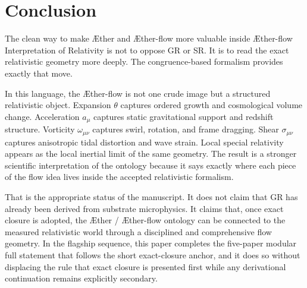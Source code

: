 \documentclass[11pt]{article}
\newcommand{\Aether}{\AE{}ther}
\newcommand{\Aflow}{\AE{}ther-flow}
\newcommand{\TheoryName}{\Aflow{} Interpretation of Relativity}
\begin{document}
\section{Conclusion}

The clean way to make \Aether{} and \Aflow{} more valuable inside \TheoryName{} is not to oppose GR or SR. It is to read the exact relativistic geometry more deeply. The congruence-based formalism provides exactly that move.

In this language, the \Aflow{} is not one crude image but a structured relativistic object. Expansion \(\theta\) captures ordered growth and cosmological volume change. Acceleration \(a_\mu\) captures static gravitational support and redshift structure. Vorticity \(\omega_{\mu\nu}\) captures swirl, rotation, and frame dragging. Shear \(\sigma_{\mu\nu}\) captures anisotropic tidal distortion and wave strain. Local special relativity appears as the local inertial limit of the same geometry. The result is a stronger scientific interpretation of the ontology because it says exactly where each piece of the flow idea lives inside the accepted relativistic formalism.

That is the appropriate status of the manuscript. It does not claim that GR has already been derived from substrate microphysics. It claims that, once exact closure is adopted, the \Aether{} / \Aflow{} ontology can be connected to the measured relativistic world through a disciplined and comprehensive flow geometry. In the flagship sequence, this paper completes the five-paper modular full statement that follows the short exact-closure anchor, and it does so without displacing the rule that exact closure is presented first while any derivational continuation remains explicitly secondary.
\end{document}
